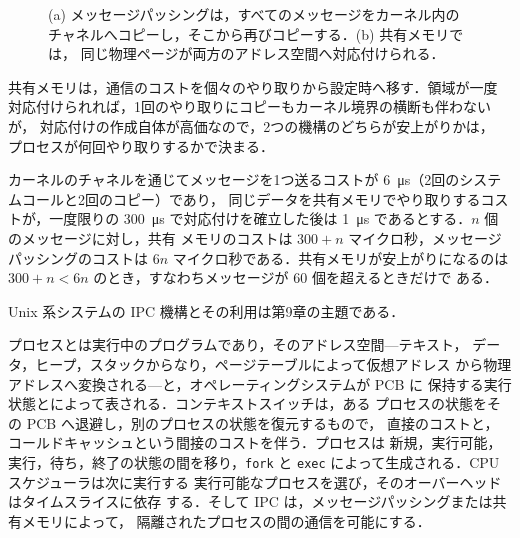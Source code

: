 \documentclass[../main.tex]{subfiles}
\begin{document}
\begin{figure}[htbp]
  \centering
  
  \caption{(a) メッセージパッシングは，すべてのメッセージをカーネル内の
    チャネルへコピーし，そこから再びコピーする．(b) 共有メモリでは，
    同じ物理ページが両方のアドレス空間へ対応付けられる．}
  \label{fig:l02-ipc}
\end{figure}

共有メモリは，通信のコストを個々のやり取りから設定時へ移す．領域が一度
対応付けられれば，1回のやり取りにコピーもカーネル境界の横断も伴わないが，
対応付けの作成自体が高価なので，2つの機構のどちらが安上がりかは，
プロセスが何回やり取りするかで決まる．

\begin{example}
  カーネルのチャネルを通じてメッセージを1つ送るコストが
  \SI{6}{\micro\second}（2回のシステムコールと2回のコピー）であり，
  同じデータを共有メモリでやり取りするコストが，一度限りの
  \SI{300}{\micro\second} で対応付けを確立した後は
  \SI{1}{\micro\second} であるとする．$n$ 個のメッセージに対し，共有
  メモリのコストは $300 + n$ マイクロ秒，メッセージパッシングのコストは
  $6n$ マイクロ秒である．共有メモリが安上がりになるのは
  $300 + n < 6n$ のとき，すなわちメッセージが 60 個を超えるときだけで
  ある．
\end{example}

Unix 系システムの IPC 機構とその利用は第9章の主題である．%


\begin{keypoint}[章のまとめ]
  プロセスとは実行中のプログラムであり，そのアドレス空間---テキスト，
  データ，ヒープ，スタックからなり，ページテーブルによって仮想アドレス
  から物理アドレスへ変換される---と，オペレーティングシステムが PCB に
  保持する実行状態とによって表される．コンテキストスイッチは，ある
  プロセスの状態をその PCB へ退避し，別のプロセスの状態を復元するもので，
  直接のコストと，コールドキャッシュという間接のコストを伴う．プロセスは
  新規，実行可能，実行，待ち，終了の状態の間を移り，\texttt{fork} と
  \texttt{exec} によって生成される．CPU スケジューラは次に実行する
  実行可能なプロセスを選び，そのオーバーヘッドはタイムスライスに依存
  する．そして IPC は，メッセージパッシングまたは共有メモリによって，
  隔離されたプロセスの間の通信を可能にする．
\end{keypoint}
\end{document}
